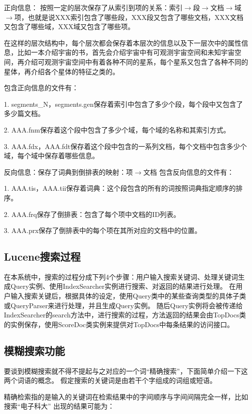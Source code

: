 正向信息：
按照一定的层次保存了从索引到项的关系：索引$\rightarrow$段$\rightarrow$文档$\rightarrow$域\\$\rightarrow$项，也就是说XXX索引包含了哪些段，XXX段又包含了哪些文档，XXX文档又包含了哪些域，XXX域又包含了哪些项。

在这样的层次结构中，每个层次都会保存着本层次的信息以及下一层次中的属性信息，比如一本介绍宇宙的书，首先会介绍宇宙中有可观测宇宙空间和未知宇宙空间，再介绍可观测宇宙空间中有着各种不同的星系，每个星系又包含了各种不同的星体，再介绍各个星体的特征之类的。

包含正向信息的文件有：

1. segments\_N，segments.gen保存着索引中包含了多少个段，每个段中又包含了多少篇文档。

2. AAA.fnm保存着这个段中包含了多少个域，每个域的名称和其索引方式。

3. AAA.fdx，AAA.fdt保存着这个段中包含的一系列文档，每个文档中包含多少个域，每个域中保存着哪些信息。

反向信息：保存了词典到倒排表的映射：项$\rightarrow$文档
包含反向信息的文件有：

1. AAA.tis，AAA.tii保存着词典：这个段包含的所有的词按照词典指定顺序的排序。

2. AAA.frq保存了倒排表：包含了每个项中文档的ID列表。

3. AAA.prx保存了倒排表中的每个项在其所对应的文档中的位置。

\subsection{Lucene搜索过程}
在本系统中，搜索的过程分成下列4个步骤：用户输入搜索关键词、处理关键词生成Query实例、使用IndexSearcher实例进行搜索、对返回的结果进行处理。
在用户输入搜索关键后，根据具体的设定，使用Query类中的某些查询类型的具体子类或QueryParser来进行处理，并且生成Query实例。
随后Query实例将会被传递给IndexSearcher的search方法中，进行搜索的过程，方法返回的结果会由TopDocs类的实例保存，使用ScoreDoc类实例来提供对TopDocs中每条结果的访问接口。


\subsection{模糊搜索功能}
要谈到模糊搜索就不得不提起与之对应的一个词“精确搜索”，下面简单介绍一下这两个词语的概念。
假定搜索的关键词是由若干个字组成的词组或短语。

精确检索指的是输入的关键词在检索结果中的字间顺序与字间间隔完全一样，比如搜索“电子科大”
出现的结果可能为：

